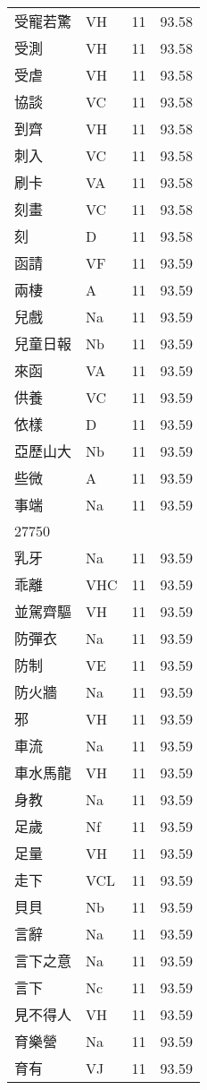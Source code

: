 \documentclass[twocolumn]{book}
\begin{document}
\begin{supertabular}{llrr}
受寵若驚 & VH & 11 &  93.58\\
受測 & VH & 11 &  93.58\\
受虐 & VH & 11 &  93.58\\
協談 & VC & 11 &  93.58\\
到齊 & VH & 11 &  93.58\\
刺入 & VC & 11 &  93.58\\
刷卡 & VA & 11 &  93.58\\
刻畫 & VC & 11 &  93.58\\
刻 & D & 11 &  93.58\\
函請 & VF & 11 &  93.59\\
兩棲 & A & 11 &  93.59\\
兒戲 & Na & 11 &  93.59\\
兒童日報 & Nb & 11 &  93.59\\
來函 & VA & 11 &  93.59\\
供養 & VC & 11 &  93.59\\
依樣 & D & 11 &  93.59\\
亞歷山大 & Nb & 11 &  93.59\\
些微 & A & 11 &  93.59\\
事端 & Na & 11 &  93.59\\
27750\\
乳牙 & Na & 11 &  93.59\\
乖離 & VHC & 11 &  93.59\\
並駕齊驅 & VH & 11 &  93.59\\
防彈衣 & Na & 11 &  93.59\\
防制 & VE & 11 &  93.59\\
防火牆 & Na & 11 &  93.59\\
邪 & VH & 11 &  93.59\\
車流 & Na & 11 &  93.59\\
車水馬龍 & VH & 11 &  93.59\\
身教 & Na & 11 &  93.59\\
足歲 & Nf & 11 &  93.59\\
足量 & VH & 11 &  93.59\\
走下 & VCL & 11 &  93.59\\
貝貝 & Nb & 11 &  93.59\\
言辭 & Na & 11 &  93.59\\
言下之意 & Na & 11 &  93.59\\
言下 & Nc & 11 &  93.59\\
見不得人 & VH & 11 &  93.59\\
育樂營 & Na & 11 &  93.59\\
育有 & VJ & 11 &  93.59\\

\end{supertabular}
\end{document}
